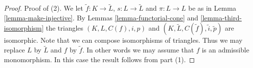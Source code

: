 \documentclass[10pt,a4paper]{amsart}
\theoremstyle{plain}
\theoremstyle{definition}
\theoremstyle{remark}
\numberwithin{equation}{subsection}
\begin{document}
\begin{proof}
\medskip\noindent
Proof of (2). We let $\tilde f : K \to \tilde L$,
$s : L \to \tilde L$
and $\pi : L \to L$ be as in
Lemma \ref{lemma-make-injective}. By
Lemmas \ref{lemma-functorial-cone} and \ref{lemma-third-isomorphism}
the triangles $(K, L, C(f), i, p)$ and
$(K, \tilde L, C(\tilde f), \tilde i, \tilde p)$
are isomorphic. Note that we can compose isomorphisms of
triangles. Thus we may replace $L$ by
$\tilde L$ and $f$ by $\tilde f$. In other words
we may assume that $f$ is an admissible monomorphism.
In this case the result follows from part (1).
\end{proof}
\end{document}
